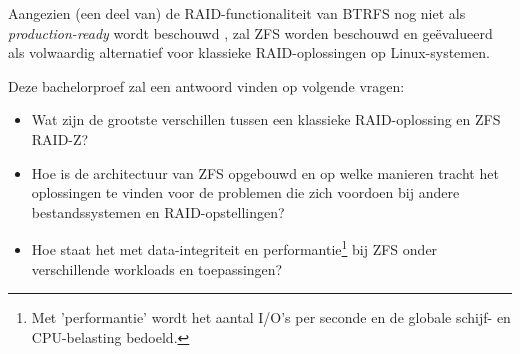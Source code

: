 Aangezien (een deel van) de RAID-functionaliteit van BTRFS nog niet als \textit{production-ready} wordt beschouwd \autocite{Project2017}, zal ZFS worden beschouwd en geëvalueerd als volwaardig alternatief voor klassieke RAID-oplossingen op Linux-systemen. 

Deze bachelorproef zal een antwoord vinden op volgende vragen:

\begin{itemize}
	\item{Wat zijn de grootste verschillen tussen een klassieke RAID-oplossing en ZFS RAID-Z?}
	\item{Hoe is de architectuur van ZFS opgebouwd en op welke manieren tracht het oplossingen te vinden voor de problemen die zich voordoen bij andere bestandssystemen en RAID-opstellingen?}
  \item{Hoe staat het met data-integriteit en \gls{performantie}\footnote{Met 'performantie' wordt het aantal I/O's per seconde en de globale schijf- en CPU-belasting bedoeld.} bij ZFS onder verschillende workloads en toepassingen?}
\end{itemize}


